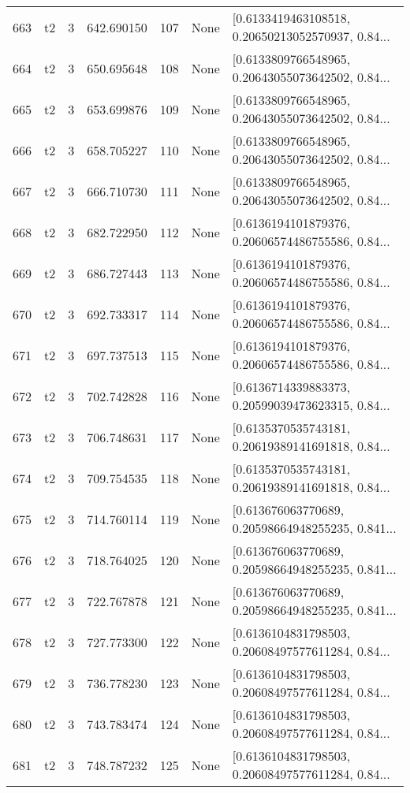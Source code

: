 \begin{tabular}{lllrlll}
663 &  t2 &   3 &   642.690150 &  107 &  None &  [0.6133419463108518, 0.20650213052570937, 0.84... \\
664 &  t2 &   3 &   650.695648 &  108 &  None &  [0.6133809766548965, 0.20643055073642502, 0.84... \\
665 &  t2 &   3 &   653.699876 &  109 &  None &  [0.6133809766548965, 0.20643055073642502, 0.84... \\
666 &  t2 &   3 &   658.705227 &  110 &  None &  [0.6133809766548965, 0.20643055073642502, 0.84... \\
667 &  t2 &   3 &   666.710730 &  111 &  None &  [0.6133809766548965, 0.20643055073642502, 0.84... \\
668 &  t2 &   3 &   682.722950 &  112 &  None &  [0.6136194101879376, 0.20606574486755586, 0.84... \\
669 &  t2 &   3 &   686.727443 &  113 &  None &  [0.6136194101879376, 0.20606574486755586, 0.84... \\
670 &  t2 &   3 &   692.733317 &  114 &  None &  [0.6136194101879376, 0.20606574486755586, 0.84... \\
671 &  t2 &   3 &   697.737513 &  115 &  None &  [0.6136194101879376, 0.20606574486755586, 0.84... \\
672 &  t2 &   3 &   702.742828 &  116 &  None &  [0.6136714339883373, 0.20599039473623315, 0.84... \\
673 &  t2 &   3 &   706.748631 &  117 &  None &  [0.6135370535743181, 0.20619389141691818, 0.84... \\
674 &  t2 &   3 &   709.754535 &  118 &  None &  [0.6135370535743181, 0.20619389141691818, 0.84... \\
675 &  t2 &   3 &   714.760114 &  119 &  None &  [0.613676063770689, 0.20598664948255235, 0.841... \\
676 &  t2 &   3 &   718.764025 &  120 &  None &  [0.613676063770689, 0.20598664948255235, 0.841... \\
677 &  t2 &   3 &   722.767878 &  121 &  None &  [0.613676063770689, 0.20598664948255235, 0.841... \\
678 &  t2 &   3 &   727.773300 &  122 &  None &  [0.6136104831798503, 0.20608497577611284, 0.84... \\
679 &  t2 &   3 &   736.778230 &  123 &  None &  [0.6136104831798503, 0.20608497577611284, 0.84... \\
680 &  t2 &   3 &   743.783474 &  124 &  None &  [0.6136104831798503, 0.20608497577611284, 0.84... \\
681 &  t2 &   3 &   748.787232 &  125 &  None &  [0.6136104831798503, 0.20608497577611284, 0.84... \\

\end{tabular}
